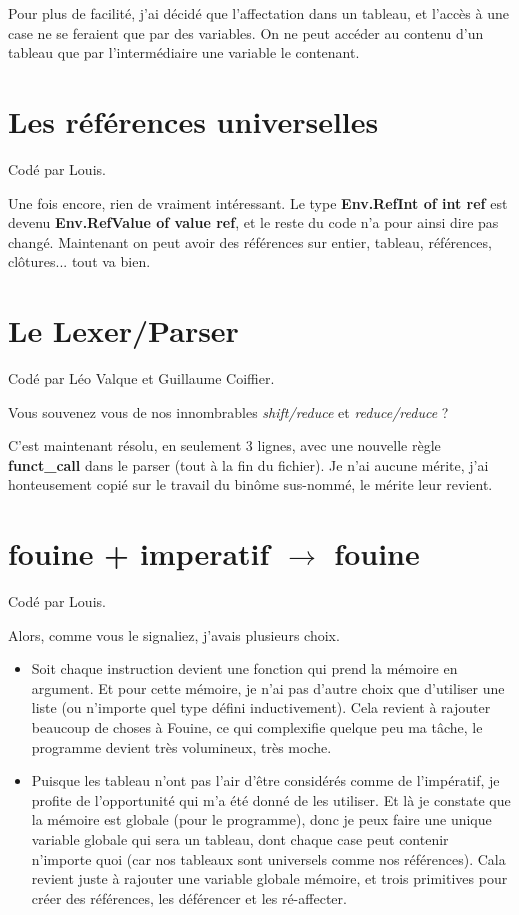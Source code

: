 \documentclass[a4paper,10pt]{report}
\begin{document}
Pour plus de facilité, j'ai décidé que l'affectation dans un tableau, et l'accès à une case ne se feraient que par des variables. On ne peut accéder au contenu d'un tableau que par l'intermédiaire une variable le contenant. 
  
\section{Les références universelles}  

Codé par Louis.  
  
Une fois encore, rien de vraiment intéressant. Le type \textbf{Env.RefInt of int ref} est devenu \textbf{Env.RefValue of value ref}, et le reste du code n'a pour ainsi dire pas changé. Maintenant on peut avoir des références sur entier, tableau, références, clôtures... tout va bien.  
  
\section{Le Lexer/Parser}  
Codé par Léo Valque et Guillaume Coiffier.  
  
Vous souvenez vous de nos innombrables \textit{shift/reduce} et \textit{reduce/reduce} ?  
  
C'est maintenant résolu, en seulement 3 lignes, avec une nouvelle règle \textbf{funct\_{}call} dans le parser (tout à la fin du fichier). Je n'ai aucune mérite, j'ai honteusement copié sur le travail du binôme sus-nommé, le mérite leur revient.  

\newpage
  
\section{fouine + imperatif $\rightarrow$ fouine}  
Codé par Louis.  
  
Alors, comme vous le signaliez, j'avais plusieurs choix.  

\begin{itemize}
\item Soit chaque instruction devient une fonction qui prend la mémoire en argument. Et pour cette mémoire, je n'ai pas d'autre choix que d'utiliser une liste (ou n'importe quel type défini inductivement). Cela revient à rajouter beaucoup de choses à Fouine, ce qui complexifie quelque peu ma tâche, le programme devient très volumineux, très moche. 
\item Puisque les tableau n'ont pas l'air d'être considérés comme de l'impératif, je profite de l'opportunité qui m'a été donné de les utiliser. Et là je constate que la mémoire est globale (pour le programme), donc je peux faire une unique variable globale qui sera un tableau, dont chaque case peut contenir n'importe quoi (car nos tableaux sont universels comme nos références). Cala revient juste à rajouter une variable globale mémoire, et trois primitives pour créer des références, les déférencer et les ré-affecter.  
\end{itemize}
\end{document}
